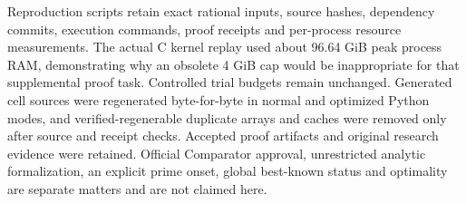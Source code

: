 \documentclass[11pt]{article}
\begin{document}
Reproduction scripts retain exact rational inputs, source hashes, dependency commits, execution commands, proof receipts and per-process resource measurements. The actual C kernel replay used about 96.64 GiB peak process RAM, demonstrating why an obsolete 4 GiB cap would be inappropriate for that supplemental proof task. Controlled trial budgets remain unchanged. Generated cell sources were regenerated byte-for-byte in normal and optimized Python modes, and verified-regenerable duplicate arrays and caches were removed only after source and receipt checks. Accepted proof artifacts and original research evidence were retained. Official Comparator approval, unrestricted analytic formalization, an explicit prime onset, global best-known status and optimality are separate matters and are not claimed here.


\begin{center}


\ifdim\wd\eqbox>\linewidth\resizebox{\linewidth}{!}{\usebox{\eqbox}}\else\usebox{\eqbox}\fi

\end{center}

\begin{center}


\ifdim\wd\eqbox>\linewidth\resizebox{\linewidth}{!}{\usebox{\eqbox}}\else\usebox{\eqbox}\fi

\end{center}

\begin{center}


\ifdim\wd\eqbox>\linewidth\resizebox{\linewidth}{!}{\usebox{\eqbox}}\else\usebox{\eqbox}\fi

\end{center}

\begin{center}


\ifdim\wd\eqbox>\linewidth\resizebox{\linewidth}{!}{\usebox{\eqbox}}\else\usebox{\eqbox}\fi

\end{center}
\end{document}
